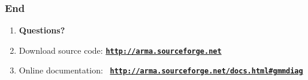 \documentclass[usenames,dvipsnames]{beamer}
\def\_{{\tt\char95}}
\begin{document}
%
%
%

\begin{frame}
\frametitle{End}

\begin{enumerate}[{~~$\boldsymbol{\bullet}$}]

\item
{\bf Questions?}
\vspace{1ex}

\item Download source code: \textcolor{red}{\href{http://arma.sourceforge.net}{\tt\textbf{http://arma.sourceforge.net}}}
\vspace{1ex}

\item Online documentation: ~\textcolor{red}{\href{http://arma.sourceforge.net/docs.html\#gmm_diag}{\tt\textbf{http://arma.sourceforge.net/docs.html\#gmm\_diag}}}
\vspace{1ex}

\end{enumerate}
\end{frame}

%
%
%

% 
% 
% 
% 
% 
% 
\end{document}
